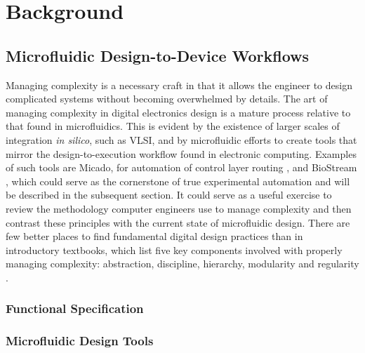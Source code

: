 \chapter{Background}
\label{chapter:background}
\thispagestyle{myheadings}

\section{Microfluidic Design-to-Device Workflows}
\label{sec:backgroundMF}

Managing complexity is a necessary craft in that it allows the engineer to design complicated systems without becoming overwhelmed by details. The art of managing complexity in digital electronics design is  a mature process relative to that found in microfluidics. This is evident by the existence of larger scales of integration \emph{in silico}, such as VLSI, and by microfluidic efforts to create tools that mirror the design-to-execution workflow found in electronic computing. Examples of such tools are Micado, for automation of control layer routing \cite{amin2009}, and BioStream \cite{thies2008}, which could serve as the cornerstone of true experimental automation and will be described in the subsequent section. It could serve as a useful exercise to review the methodology computer engineers use to manage complexity and then contrast these principles with the current state of microfluidic design. There are few better places to find fundamental digital design practices than in introductory textbooks, which list five key components involved with properly managing complexity: abstraction, discipline, hierarchy, modularity and regularity \cite{Harris+Harris}.

\subsection{Functional Specification}
\label{ssec:backgroundSpecify}

\subsection{Microfluidic Design Tools}
\label{ssec:DesignTools}

